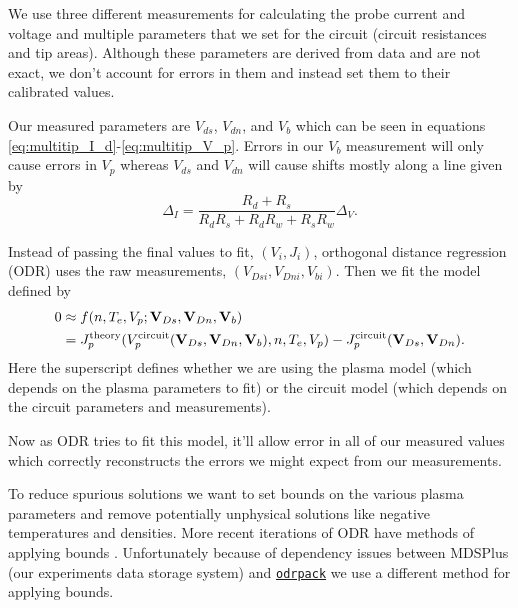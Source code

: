 We use three different measurements for calculating the probe current and voltage and multiple parameters that we set for the circuit (circuit resistances and tip areas). Although these parameters are derived from data and are not exact, we don't account for errors in them and instead set them to their calibrated values.

Our measured parameters are $V_{ds}$, $V_{dn}$, and $V_b$ which can be seen in equations \ref{eq:multitip_I_d}-\ref{eq:multitip_V_p}. Errors in our $V_b$ measurement will only cause errors in $V_p$ whereas $V_{ds}$ and $V_{dn}$ will cause shifts mostly along a line given by
\begin{equation*}
    \Delta_I = \frac{R_d + R_s}{R_d R_s + R_d R_w + R_s R_w} \Delta_V.
\end{equation*}


Instead of passing the final values to fit, $(V_i, J_i)$, orthogonal distance regression (ODR) uses the raw measurements, $(V_{Dsi}, V_{Dni}, V_{bi})$. Then we fit the model defined by
\begin{align*}
    0 &\approx f(n, T_e, V_p; \vb{V}_{Ds}, \vb{V}_{Dn}, \vb{V}_{b}) \\
    &= J_p^\text{theory}(V_p^\text{circuit}(\vb{V}_{Ds}, \vb{V}_{Dn}, \vb{V}_{b}), n, T_e, V_p) - J_p^\text{circuit}(\vb{V}_{Ds}, \vb{V}_{Dn}).
\end{align*}
Here the superscript defines whether we are using the plasma model (which depends on the plasma parameters to fit) or the circuit model (which depends on the circuit parameters and measurements).

Now as ODR tries to fit this model, it'll allow error in all of our measured values which correctly reconstructs the errors we might expect from our measurements.


To reduce spurious solutions we want to set bounds on the various plasma parameters and remove potentially unphysical solutions like negative temperatures and densities. More recent iterations of ODR have methods of applying bounds \cite{Zwolak_et_al_2007}. Unfortunately because of dependency issues between MDSPlus (our experiments data storage system) and \href{https://pypi.org/project/odrpack/}{\texttt{odrpack}} we use a different method for applying bounds.

